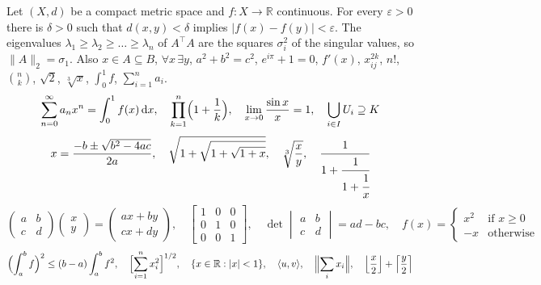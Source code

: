 \documentclass[11pt]{article}
\begin{document}
Let $(X,d)$ be a compact metric space and $f\colon X\to\mathbb{R}$ continuous. For every $\varepsilon>0$ there is
$\delta>0$ such that $d(x,y)<\delta$ implies $|f(x)-f(y)|<\varepsilon$. The eigenvalues
$\lambda_1\ge\lambda_2\ge\dots\ge\lambda_n$ of $A^{\top}A$ are the squares $\sigma_i^2$ of the singular values, so
$\|A\|_2=\sigma_1$. Also $x\in A\subseteq B$, $\forall x\,\exists y$, $a^2+b^2=c^2$, $e^{i\pi}+1=0$, $f'(x)$,
$x_{ij}^{2k}$, $n!$, $\binom{n}{k}$, $\sqrt{2}$, $\sqrt[3]{x}$, $\int_0^1 f$, $\sum_{i=1}^n a_i$.
\[ \sum_{n=0}^{\infty} a_n x^n = \int_0^1 f(x)\,\mathrm{d}x,\quad \prod_{k=1}^{n}\Bigl(1+\frac1k\Bigr),\quad
   \lim_{x\to0}\frac{\sin x}{x}=1,\quad \bigcup_{i\in I}U_i\supseteq K \]
\[ x=\frac{-b\pm\sqrt{b^2-4ac}}{2a},\quad \sqrt{1+\sqrt{1+\sqrt{1+x}}},\quad \sqrt[3]{\frac{x}{y}},\quad
   \cfrac{1}{1+\cfrac{1}{1+\cfrac1x}} \]
\[ \begin{pmatrix}a&b\\c&d\end{pmatrix}\begin{pmatrix}x\\y\end{pmatrix}=\begin{pmatrix}ax+by\\cx+dy\end{pmatrix},\quad
   \begin{bmatrix}1&0&0\\0&1&0\\0&0&1\end{bmatrix},\quad \det\begin{vmatrix}a&b\\c&d\end{vmatrix}=ad-bc,\quad
   f(x)=\begin{cases}x^2&\text{if }x\ge0\\-x&\text{otherwise}\end{cases} \]
\[ \Bigl(\int_a^b f\Bigr)^2\le(b-a)\int_a^b f^2,\quad \Bigl[\sum_{i=1}^n x_i^2\Bigr]^{1/2},\quad
   \{x\in\mathbb{R}:|x|<1\},\quad \langle u,v\rangle,\quad \Bigl\|\sum_i x_i\Bigr\|,\quad
   \Bigl\lfloor\frac x2\Bigr\rfloor+\Bigl\lceil\frac y2\Bigr\rceil \]
\end{document}
